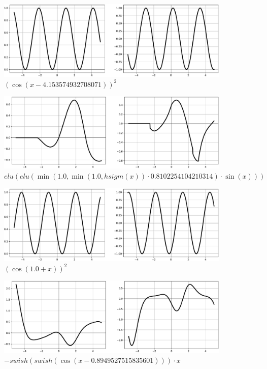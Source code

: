 \documentclass[times, utf8, numeric, diplomski]{fer}
\begin{document}
\begin{figure}[H]
\includegraphics[width=\textwidth]{dpav2_gp_f1.pdf}
\centering
\caption{$(\cos(x-4.153574932708071))^2$}
\label{fig:dpav2_gp_f1}
\end{figure}
\begin{figure}[H]
\includegraphics[width=\textwidth]{dpav2_gp_f2.pdf}
\centering
\caption{$elu (elu (\min (1.0,\min (1.0,hsigm (x)) \cdot 0.8102254104210314) \cdot \sin (x)))$}
\label{fig:dpav2_gp_f2}
\end{figure}
\begin{figure}[H]
\includegraphics[width=\textwidth]{dpav2_gp_f3.pdf}
\centering
\caption{$(\cos(1.0 + x))^2$}
\label{fig:dpav2_gp_f3}
\end{figure}
\begin{figure}[H]
\includegraphics[width=\textwidth]{dpav2_gp_f4.pdf}
\centering
\caption{$-swish(swish(\cos(x - 0.8949527515835601))) \cdot x$}
\label{fig:dpav2_gp_f4}
\end{figure}
\end{document}
